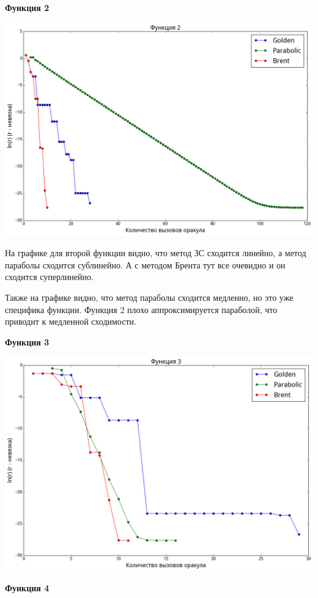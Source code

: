 \documentclass[12pt, a4paper]{article}
\begin{document}
        \textbf{Функция 2}

        \includegraphics[width=\picwidth]{pics/fun2_nonder.png}

        На графике для второй функции видно, что метод ЗС сходится линейно, а метод параболы сходится сублинейно. А с методом Брента тут все очевидно и он сходится суперлинейно.

        Также на графике видно, что метод параболы сходится медленно, но это уже специфика функции. Функция 2 плохо аппроксимируется параболой, что приводит к медленной сходимости.

        \textbf{Функция 3}

        \includegraphics[width=\picwidth]{pics/fun3_nonder.png}

        \textbf{Функция 4}
\end{document}
